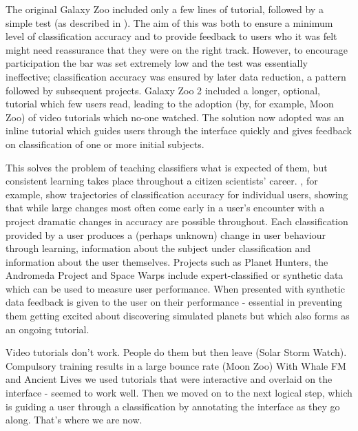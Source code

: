 \documentclass{sigchi}
\begin{document}
The original Galaxy Zoo included only a few lines of tutorial, followed by a simple test (as described in \cite{Lintott}). The aim of this was both to ensure a minimum level of classification accuracy and to provide feedback to users who it was felt might need reassurance that they were on the right track. However, to encourage participation the bar was set extremely low and the test was essentially ineffective; classification accuracy was ensured by later data reduction, a pattern followed by subsequent projects. Galaxy Zoo 2 included a longer, optional, tutorial which few users read, leading to the adoption (by, for example, Moon Zoo) of video tutorials which no-one watched. The solution now adopted was an inline tutorial which guides users through the interface quickly and gives feedback on classification of one or more initial subjects.

This solves the problem of teaching classifiers what is expected of them, but consistent learning takes place throughout a citizen scientists' career. \cite{Smith}, for example, show trajectories of classification accuracy for individual users, showing that while large changes most often come early in a user's encounter with a project dramatic changes in accuracy are possible throughout. Each classification provided by a user produces a (perhaps unknown) change in user behaviour through learning, information about the subject under classification and information about the user themselves. Projects such as Planet Hunters, the Andromeda Project and Space Warps include expert-classified or synthetic data which can be used to measure user performance. When presented with synthetic data feedback is given to the user on their performance - essential in preventing them getting excited about discovering simulated planets but which also forms as an ongoing tutorial. 

Video tutorials don't work. People do them but then leave (Solar Storm Watch). %
Compulsory training results in a large bounce rate (Moon Zoo) %
With Whale FM and Ancient Lives we used tutorials that were interactive and overlaid on the interface - seemed to work well.
Then we moved on to the next logical step, which is guiding a user through a classification by annotating the interface as they go along. That's where we are now.


\end{document}
